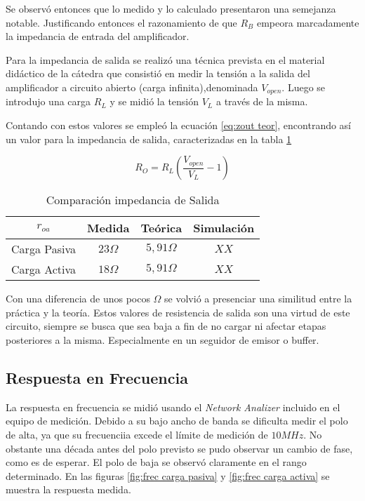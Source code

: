 Se observó entonces que lo medido y lo calculado presentaron una semejanza notable. Justificando entonces el razonamiento de que $R_B$ empeora marcadamente la impedancia de entrada del amplificador.

Para la impedancia de salida se realizó una técnica prevista en el material didáctico de la cátedra que consistió en medir la tensión a la salida del amplificador a circuito abierto (carga infinita),denominada $V_{open}$. Luego se introdujo una carga $R_L$ y se midió la tensión $V_L$ a través de la misma.

Contando con estos valores se empleó la ecuación \eqref{eq:zout teor}, encontrando así un valor para la impedancia de salida, caracterizadas en la tabla \ref{table:Ro comp}

\begin{equation}
    R_O = R_L(\frac{V_{open}}{V_L}-1)
    \label{eq:zout teor}
\end{equation}

\begin{table}[ht]
    \centering
    \begin{tabular}{|c|c|c|c|}
    \hline
    $r_{oa}$     & Medida     & Teórica         & Simulación \\ \hline
    Carga Pasiva & $23\Omega$ & $5,91\Omega $   &  $XX $          \\ \hline
    Carga Activa & $18\Omega$ &  $5,91\Omega $  &  $XX $          \\ \hline
    \end{tabular}
    \caption{Comparación impedancia de Salida}\label{table:Ro comp}
\end{table}

Con una diferencia de unos pocos $\Omega$ se volvió a presenciar una similitud entre la práctica y la teoría. Estos valores de resistencia de salida son una virtud de este circuito, siempre se busca que sea baja a fin de no cargar ni afectar etapas posteriores a la misma. Especialmente en un seguidor de emisor o buffer.

\subsection{Respuesta en Frecuencia}

La respuesta en frecuencia se midió usando el \textit{Network Analizer} incluido en el equipo de medición. Debido a su bajo ancho de banda se dificulta medir el polo de alta, ya que su frecuenciia excede el límite de medición de $10 MHz$. No obstante una década antes del polo previsto se pudo observar un cambio de fase, como es de esperar.
El polo de baja se observó claramente en el rango determinado. En las figuras \ref{fig:frec carga pasiva} y \ref{fig:frec carga activa} se muestra la respuesta medida.

